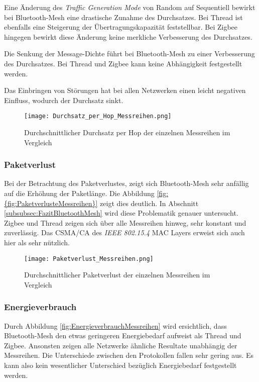 Eine Änderung des \textit{Traffic Generation Mode} von Random auf Sequentiell bewirkt bei Bluetooth-Mesh eine drastische Zunahme des Durchsatzes.
Bei Thread ist ebenfalls eine Steigerung der Übertragungskapazität feststellbar.
Bei Zigbee hingegen bewirkt diese Änderung keine merkliche Verbesserung des Durchsatzes.

Die Senkung der Message-Dichte führt bei Bluetooth-Mesh zu einer Verbesserung des Durchsatzes. Bei Thread und Zigbee kann keine Abhängigkeit festgestellt werden.

Das Einbringen von Störungen hat bei allen Netzwerken einen leicht negativen Einfluss, wodurch der Durchsatz sinkt. 

\begin{figure}[H]
	\centering
	\texttt{[image: Durchsatz\_per\_Hop\_Messreihen.png]}
	\caption{Durchschnittlicher Durchsatz per Hop der einzelnen Messreihen im Vergleich}\label{fig:Durchsätze_per_Hop_Messreihen}
\end{figure}

\subsubsection{Paketverlust}\label{subsec:VergleichPaketverlustMessreihen}
Bei der Betrachtung des Paketverlustes, zeigt sich Bluetooth-Mesh sehr anfällig auf die Erhöhung der Paketlänge.
Die Abbildung \ref{fig:{fig:PaketverlusteMessreihen}} zeigt dies deutlich.
In Abschnitt \ref{subsubsec:FazitBluetoothMesh} wird diese Problematik genauer untersucht.
Zigbee und Thread zeigen sich über alle Messreihen hinweg, sehr konstant und zuverlässig.
Das CSMA\slash CA des \textit{IEEE 802.15.4} MAC Layers erweist sich auch hier als sehr nützlich.


\begin{figure}
	\centering
	\texttt{[image: Paketverlust\_Messreihen.png]}
	\caption{Durchschnittlicher Paketverlust der einzelnen Messreihen im Vergleich}\label{fig:PaketverlusteMessreihen}
\end{figure}

\subsubsection{Energieverbrauch}\label{subsec:VergleichEnergieverbrauchMessreihen}
Durch Abbildung \ref{fig:EnergieverbrauchMessreihen} wird ersichtlich, dass Bluetooth-Mesh den etwas geringeren Energiebedarf aufweist als Thread und Zigbee. Ansonsten zeigen alle Netzwerke ähnliche Resultate unabhängig der Messreihen.
Die Unterschiede zwischen den Protokollen fallen sehr gering aus.
Es kann also kein wesentlicher Unterschied bezüglich Energiebedarf festgestellt werden.

